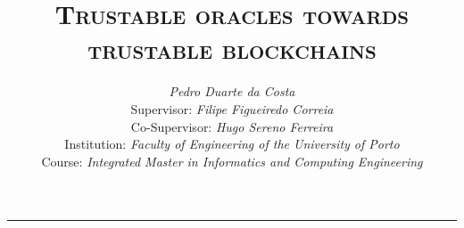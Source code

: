 \documentclass[9pt,a4paper]{extarticle}
\begin{document}
\title{\vspace*{-8mm}\textbf{\textsc{Trustable oracles towards trustable blockchains}}}
\author{\emph{Pedro Duarte da Costa}\\[2mm]
\small{Supervisor: \emph{Filipe Figueiredo Correia}}\\
\small{Co-Supervisor: \emph{Hugo Sereno Ferreira}\\
\small{Institution: \emph{Faculty of Engineering of the University of Porto}}\\
\small{Course: \emph{Integrated Master in Informatics and Computing Engineering}}}\\
\date{}
}
\maketitle
\thispagestyle{empty}


\vspace*{-4mm}\noindent\rule{\textwidth}{0.4pt}\vspace*{4mm}





\newpage


% 
\end{document}
